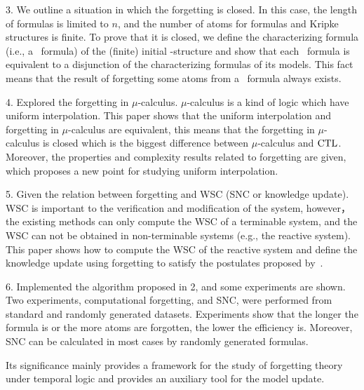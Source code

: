 \begin{englishabstract}
3. We outline a situation in which the forgetting is closed. In this case, the length of formulas is limited to $n$, and the number of atoms for formulas and Kripke structures is finite. To prove that it is closed, we define the characterizing formula (i.e., a \CTL\ formula) of the (finite) initial \MPK-structure and show that each \CTL\ formula is equivalent to a disjunction of the characterizing formulas of its models.  This fact means that the result of forgetting some atoms from a \CTL\ formula always exists. 

4. Explored the forgetting in $\mu$-calculus. $\mu$-calculus is a kind of logic which have uniform interpolation. This paper shows that the uniform interpolation and forgetting in $\mu$-calculus are equivalent, this means that the forgetting in $\mu$-calculus is closed which is the biggest difference between $\mu$-calculus and $\textrm{CTL}$. Moreover, the properties and complexity results related to forgetting are given, which proposes a new point for studying uniform interpolation.

5. Given the relation between forgetting and WSC (SNC or knowledge update). WSC is important to the verification and modification of the system, however， the existing methods can only compute the WSC of a terminable system, and the WSC can not be obtained in non-terminable systems (e.g., the reactive system). This paper shows how to compute the WSC of the reactive system and define the knowledge update using forgetting to satisfy the postulates proposed by~\citeauthor{katsuno91mendelzon}.

6. Implemented the algorithm proposed in 2, and some experiments are shown. Two experiments, computational forgetting, and SNC, were performed from standard and randomly generated datasets. Experiments show that the longer the formula is or the more atoms are forgotten, the lower the efficiency is. Moreover, SNC can be calculated in most cases by randomly generated formulas.

Its significance mainly provides a framework for the study of forgetting theory under temporal logic and provides an auxiliary tool for the model update.


\end{englishabstract}

